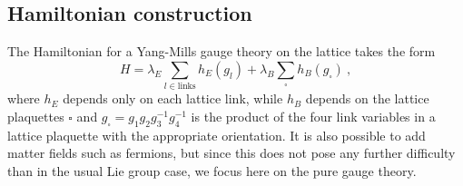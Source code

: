 \subsection{Hamiltonian construction}


The Hamiltonian for a Yang-Mills gauge theory on the lattice takes the form \cite{kogut1975hamiltonian, ZoharBurrello}
\begin{equation}
    \label{eq:generic hamiltonian}
    H = \lambda_E \sum_{l \in \mathrm{links}} h_E(g_l) + \lambda_B \sum_{\square} h_B(g_\square) \ ,
\end{equation}
where $h_E$ depends only on each lattice link, while $h_B$ depends on the lattice plaquettes $\square$ and $g_\square = g_1 g_2 g_3^{-1} g_4^{-1}$ is the product of the four link variables in a lattice plaquette with the appropriate orientation.
It is also possible to add matter fields such as fermions, but since this does not pose any further difficulty than in the usual Lie group case, we focus here on the pure gauge theory.

